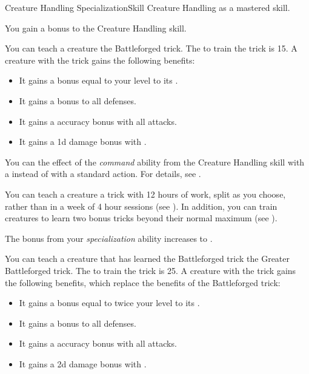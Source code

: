     \begin{feat}{Creature Handling Specialization}{Skill}
        \featpre Creature Handling as a mastered skill.

         You gain a  bonus to the Creature Handling skill.

         You can teach a creature the Battleforged trick.
        The  to train the trick is 15.
        A creature with the trick gains the following benefits:
        \begin{itemize}
            \item It gains a bonus equal to your level to its .
            \item It gains a  bonus to all defenses.
            \item It gains a  accuracy bonus with all attacks.
            \item It gains a \plus1d damage bonus with .
        \end{itemize}

         You can  the effect of the \textit{command} ability from the Creature Handling skill with a  instead of with a standard action.
        For details, see .

         You can teach a creature a trick with 12 hours of work, split as you choose, rather than in a week of 4 hour sessions (see ).
        In addition, you can train creatures to learn two bonus tricks beyond their normal maximum (see ).

         The bonus from your \textit{specialization} ability increases to .

         You can teach a creature that has learned the Battleforged trick the Greater Battleforged trick.
        The  to train the trick is 25.
        A creature with the trick gains the following benefits, which replace the benefits of the Battleforged trick:
        \begin{itemize}
            \item It gains a bonus equal to twice your level to its .
            \item It gains a  bonus to all defenses.
            \item It gains a  accuracy bonus with all attacks.
            \item It gains a \plus2d damage bonus with .
        \end{itemize}


\end{feat}
